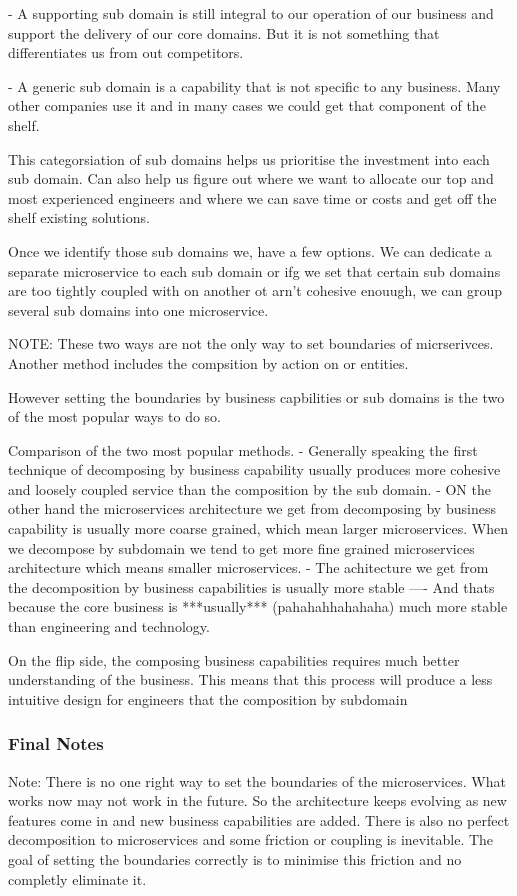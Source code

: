 \documentclass[a4paper, 11pt]{book}
\begin{document}
    - A supporting sub domain is still integral to our operation of our business and support the delivery of our core domains.
    But it is not something that differentiates us from out competitors.

    - A generic sub domain is a capability that is not specific to any business.
    Many other companies use it and in many cases we could get that component of the shelf.

    This categorsiation of sub domains helps us prioritise the investment into each sub domain.
    Can also help us figure out where we want to allocate our top and most experienced engineers and where we can save time or costs and get off the shelf existing solutions.

    Once we identify those sub domains we, have a few options.
    We can dedicate a separate microservice to each sub domain or ifg we set that certain sub domains are too tightly coupled with on another ot arn't cohesive enouugh, we can group several sub domains into one microservice.

    NOTE: These two ways are not the only way to set boundaries of micrserivces.
    Another method includes the compsition by action on or entities.

    However setting the boundaries by business capbilities or sub domains is the two of the most popular ways to do so.

    Comparison of the two most popular methods.
    - Generally speaking the first technique of decomposing by business capability usually produces more cohesive and loosely coupled service than the composition by the sub domain.
    - ON the other hand the microservices architecture we get from decomposing by business capability is usually more coarse grained, which mean larger microservices.
    When we decompose by subdomain we tend to get more fine grained microservices architecture which means smaller microservices.
    - The achitecture we get from the decomposition by business capabilities is usually more stable
    ---- And thats because the core business is ***usually*** (pahahahhahahaha) much more stable than engineering and technology.

    On the flip side, the composing business capabilities requires much better understanding of the business.
    This means that this process will produce a less intuitive design for engineers that the composition by subdomain

    \subsubsection{Final Notes}
    Note: There is no one right way to set the boundaries of the microservices. What works now may not work in the future.
    So the architecture keeps evolving as new features come in and new business capabilities are added.
    There is also no perfect decomposition to microservices and some friction or coupling is inevitable.
    The goal of setting the boundaries correctly is to minimise this friction and no completly eliminate it.
\end{document}
